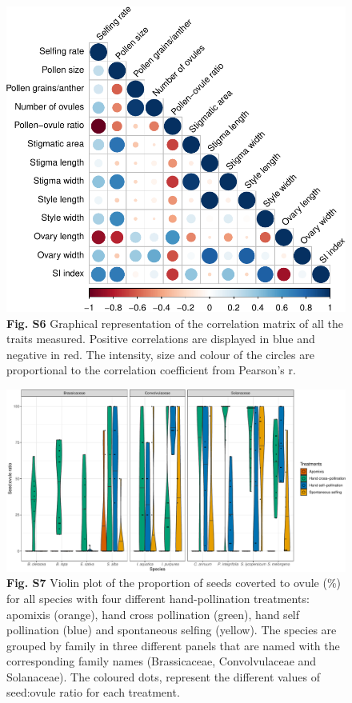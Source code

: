 \documentclass[12pt,]{article}
\begin{document}
\begin{figure}
\centering
\includegraphics{Supp_Material_files/figure-latex/unnamed-chunk-15-1.pdf}
\caption{\textbf{Fig. S6} Graphical representation of the correlation
matrix of all the traits measured. Positive correlations are displayed
in blue and negative in red. The intensity, size and colour of the
circles are proportional to the correlation coefficient from Pearson's
r.}
\end{figure}

\clearpage

\begin{figure}
\centering
\includegraphics{Supp_Material_files/figure-latex/unnamed-chunk-16-1.pdf}
\caption{\textbf{Fig. S7} Violin plot of the proportion of seeds
coverted to ovule (\%) for all species with four different
hand-pollination treatments: apomixis (orange), hand cross pollination
(green), hand self pollination (blue) and spontaneous selfing (yellow).
The species are grouped by family in three different panels that are
named with the corresponding family names (Brassicaceae, Convolvulaceae
and Solanaceae). The coloured dots, represent the different values of
seed:ovule ratio for each treatment.}
\end{figure}
\end{document}
